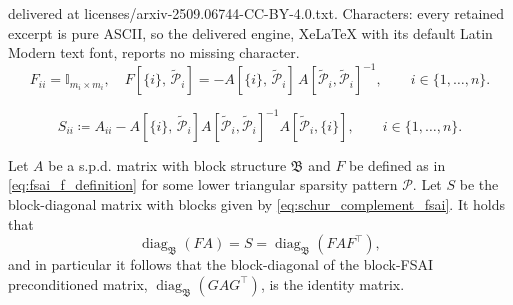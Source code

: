 \documentclass[10pt,a4paper]{amsart}
\DeclareMathOperator{\diag}{diag}
\begin{document}
delivered at licenses/arxiv-2509.06744-CC-BY-4.0.txt. Characters: every retained excerpt is pure ASCII, so the delivered engine, XeLaTeX with its default Latin Modern text font, reports no missing character.
	\begin{equation}\label{eq:fsai_f_definition}
		F_{ii} = \mathbb{I}_{m_i \times m_i}, \quad F[\{i\}, \, \tilde{\mathcal{P}}_i] = - A[\{i\},\, \tilde{\mathcal{P}}_i]\, A[\tilde{\mathcal{P}}_i, \tilde{\mathcal{P}}_i]^{-1}, \qquad i \in \{1,\dots,n\}.
	\end{equation}

	\begin{equation}\label{eq:schur_complement_fsai}
		S_{ii} \coloneqq A_{ii} - A[\{i\},\, \tilde{\mathcal{P}}_i] A[\tilde{\mathcal{P}}_i, \tilde{\mathcal{P}}_i]^{-1} A[\tilde{\mathcal{P}}_i, \{i\}], \qquad i \in \{1,\dots,n\}.
	\end{equation}

\begin{lemma}\label{thm:fsai_block_diagonal}
	Let \(A\) be a s.p.d. matrix with block structure \(\mathfrak{B}\) and \(F\) be defined as in \eqref{eq:fsai_f_definition} for some lower triangular sparsity pattern \(\mathcal{P}\). Let \(S\) be the block-diagonal matrix with blocks given by \eqref{eq:schur_complement_fsai}. It holds that
	\begin{equation*}
		\diag_{\mathfrak{B}}(FA) = S = \diag_{\mathfrak{B}}(FAF^{\top}),
	\end{equation*}
	and in particular it follows that the block-diagonal of the block-FSAI preconditioned matrix, \(\diag_{\mathfrak{B}}(GAG^{\top})\), is the identity matrix.
\end{lemma}
\end{document}
